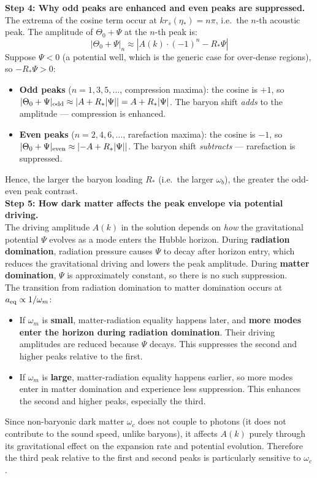 \begin{foundation}
    \textbf{Step 4: Why odd peaks are enhanced and even peaks are suppressed.} \\
    The extrema of the cosine term occur at $k r_s(\eta_*) = n\pi$, i.e.\ the $n$-th acoustic peak. The amplitude of $\Theta_0 + \Psi$ at the $n$-th peak is:
    \[
        |\Theta_0 + \Psi|_n \approx |A(k) \cdot (-1)^n - R_* \Psi|
    \]
    Suppose $\Psi < 0$ (a potential well, which is the generic case for over-dense regions), so $-R_*\Psi > 0$:
    \begin{itemize}
        \item \textbf{Odd peaks} ($n = 1, 3, 5, \dots$, compression maxima): the cosine is $+1$, so $|\Theta_0 + \Psi|_{\rm odd} \approx |A + R_*|\Psi|| = A + R_*|\Psi|$. The baryon shift \emph{adds} to the amplitude — compression is enhanced.
        \item \textbf{Even peaks} ($n = 2, 4, 6, \dots$, rarefaction maxima): the cosine is $-1$, so $|\Theta_0 + \Psi|_{\rm even} \approx |{-A + R_*|\Psi||}$. The baryon shift \emph{subtracts} — rarefaction is suppressed.
    \end{itemize}
    Hence, the larger the baryon loading $R_*$ (i.e.\ the larger $\omega_b$), the greater the odd-even peak contrast. \\

    \textbf{Step 5: How dark matter affects the peak envelope via potential driving.} \\
    The driving amplitude $A(k)$ in the solution depends on \emph{how} the gravitational potential $\Psi$ evolves as a mode enters the Hubble horizon. During \textbf{radiation domination}, radiation pressure causes $\Psi$ to decay after horizon entry, which reduces the gravitational driving and lowers the peak amplitude. During \textbf{matter domination}, $\Psi$ is approximately constant, so there is no such suppression. \\

    The transition from radiation domination to matter domination occurs at $a_{\rm eq} \propto 1/\omega_m$:
    \begin{itemize}
        \item If $\omega_m$ is \textbf{small}, matter-radiation equality happens later, and \textbf{more modes enter the horizon during radiation domination}. Their driving amplitudes are reduced because $\Psi$ decays. This suppresses the second and higher peaks relative to the first.
        \item If $\omega_m$ is \textbf{large}, matter-radiation equality happens earlier, so more modes enter in matter domination and experience less suppression. This enhances the second and higher peaks, especially the third.
    \end{itemize}
    Since non-baryonic dark matter $\omega_c$ does not couple to photons (it does not contribute to the sound speed, unlike baryons), it affects $A(k)$ purely through its gravitational effect on the expansion rate and potential evolution. Therefore the third peak relative to the first and second peaks is particularly sensitive to $\omega_c$.


\end{foundation}

